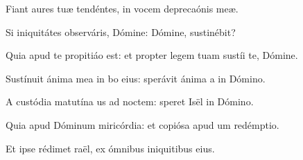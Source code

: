 \item {}

\item Fiant aures tuæ tendéntes,\psstar{} in vocem deprecaónis meæ.

\item Si iniquitátes observáris, Dómine:\psstar{} Dómine,  sustinébit?

\item Quia apud te propitiáo est:\psstar{} et propter legem tuam sustíi te, Dómine.

\item Sustínuit ánima mea in bo eius:\psstar{} sperávit ánima a in Dómino.

\item A custódia matutína us ad noctem:\psstar{} speret Isël in Dómino.

\item Quia apud Dóminum miricórdia:\psstar{} et copiósa apud um redémptio.

\item Et ipse rédimet raël,\psstar{} ex ómnibus iniquitibus eius.
